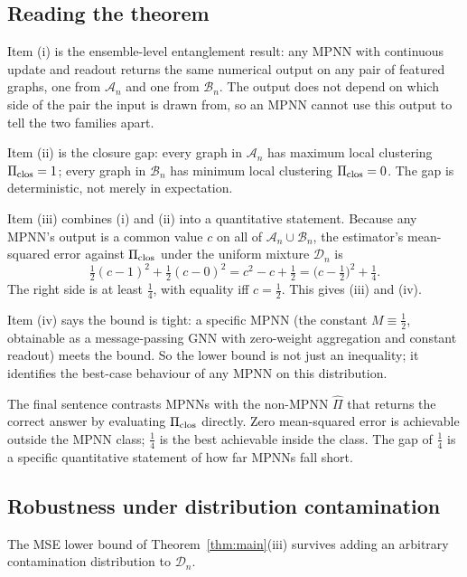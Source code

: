 \subsection{Reading the theorem}

Item (i) is the ensemble-level entanglement result: any MPNN with
continuous update and readout returns the same numerical output on
any pair of featured graphs, one from $\mathcal{A}_n$ and one from
$\mathcal{B}_n$. The output does not depend on which side of the
pair the input is drawn from, so an MPNN cannot use this output to
tell the two families apart.

Item (ii) is the closure gap: every graph in $\mathcal{A}_n$ has
maximum local clustering $\Pi_{\mathrm{clos}} = 1$; every graph in
$\mathcal{B}_n$ has minimum local clustering $\Pi_{\mathrm{clos}} = 0$. The
gap is deterministic, not merely in expectation.

Item (iii) combines (i) and (ii) into a quantitative statement.
Because any MPNN's output is a common value $c$ on all of
$\mathcal{A}_n \cup \mathcal{B}_n$, the estimator's mean-squared
error against $\Pi_{\mathrm{clos}}$ under the uniform mixture $\mathcal{D}_n$
is
\[
\tfrac{1}{2}(c - 1)^2 + \tfrac{1}{2}(c - 0)^2 = c^2 - c + \tfrac{1}{2}
= \bigl(c - \tfrac{1}{2}\bigr)^2 + \tfrac{1}{4}.
\]
The right side is at least $\tfrac{1}{4}$, with equality iff $c =
\tfrac{1}{2}$. This gives (iii) and (iv).

Item (iv) says the bound is tight: a specific MPNN (the constant
$M \equiv \tfrac{1}{2}$, obtainable as a message-passing GNN with
zero-weight aggregation and constant readout) meets the bound. So
the lower bound is not just an inequality; it identifies the
best-case behaviour of any MPNN on this distribution.

The final sentence contrasts MPNNs with the non-MPNN
$\hat{\Pi}$ that returns the correct answer by evaluating
$\Pi_{\mathrm{clos}}$ directly. Zero mean-squared error is achievable
outside the MPNN class; $\tfrac{1}{4}$ is the best achievable inside
the class. The gap of $\tfrac{1}{4}$ is a specific quantitative
statement of how far MPNNs fall short.

\subsection{Robustness under distribution contamination}

The MSE lower bound of Theorem~\ref{thm:main}(iii) survives adding an
arbitrary contamination distribution to $\mathcal{D}_n$.

